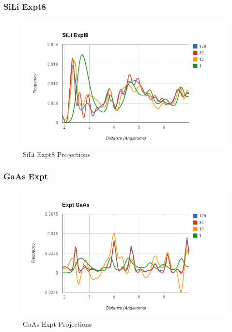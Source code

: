 \documentclass[12pt,letterpaper]{article}
\begin{document}
\subsubsection{SiLi Expt8}
\begin{figure}[ht]
  \begin{center}
    \includegraphics[scale=0.7]{figs/pca_proj_sili_expt8.png}
    \caption{SiLi Expt8 Projections}
  \end{center}
\end{figure}
\clearpage

\subsubsection{GaAs Expt}
\begin{figure}[ht]
  \begin{center}
    \includegraphics[scale=0.7]{figs/pca_proj_gaas_expt.png}
    \caption{GaAs Expt Projections}
  \end{center}
\end{figure}
\clearpage
\end{document}
